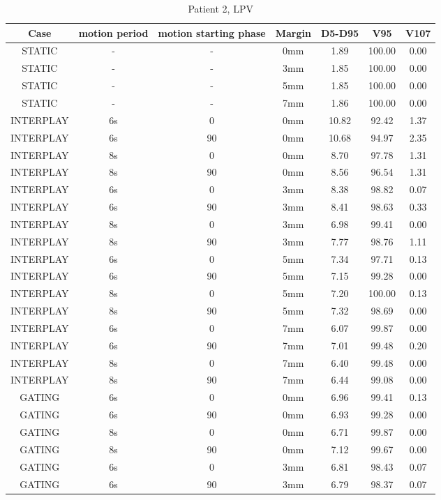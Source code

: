 \begin{table}[H]
  \centering
  \caption{Patient 2, LPV}
  \begin{tabular}{|c||c|c|c||c|c|c|}
    \hline\hline
    Case & motion period & motion starting phase & Margin & D5-D95 & V95 & V107\\
    \hline 
STATIC & - & - & 0mm & 1.89 & 100.00 & 0.00 \\
STATIC & - & - & 3mm & 1.85 & 100.00 & 0.00 \\
STATIC & - & - & 5mm & 1.85 & 100.00 & 0.00 \\
STATIC & - & - & 7mm & 1.86 & 100.00 & 0.00 \\
INTERPLAY & 6s & 0 & 0mm & 10.82 & 92.42 & 1.37 \\
INTERPLAY & 6s & 90 & 0mm & 10.68 & 94.97 & 2.35 \\
INTERPLAY & 8s & 0 & 0mm & 8.70 & 97.78 & 1.31 \\
INTERPLAY & 8s & 90 & 0mm & 8.56 & 96.54 & 1.31 \\
INTERPLAY & 6s & 0 & 3mm & 8.38 & 98.82 & 0.07 \\
INTERPLAY & 6s & 90 & 3mm & 8.41 & 98.63 & 0.33 \\
INTERPLAY & 8s & 0 & 3mm & 6.98 & 99.41 & 0.00 \\
INTERPLAY & 8s & 90 & 3mm & 7.77 & 98.76 & 1.11 \\
INTERPLAY & 6s & 0 & 5mm & 7.34 & 97.71 & 0.13 \\
INTERPLAY & 6s & 90 & 5mm & 7.15 & 99.28 & 0.00 \\
INTERPLAY & 8s & 0 & 5mm & 7.20 & 100.00 & 0.13 \\
INTERPLAY & 8s & 90 & 5mm & 7.32 & 98.69 & 0.00 \\
INTERPLAY & 6s & 0 & 7mm & 6.07 & 99.87 & 0.00 \\
INTERPLAY & 6s & 90 & 7mm & 7.01 & 99.48 & 0.20 \\
INTERPLAY & 8s & 0 & 7mm & 6.40 & 99.48 & 0.00 \\
INTERPLAY & 8s & 90 & 7mm & 6.44 & 99.08 & 0.00 \\
GATING & 6s & 0 & 0mm & 6.96 & 99.41 & 0.13 \\
GATING & 6s & 90 & 0mm & 6.93 & 99.28 & 0.00 \\
GATING & 8s & 0 & 0mm & 6.71 & 99.87 & 0.00 \\
GATING & 8s & 90 & 0mm & 7.12 & 99.67 & 0.00 \\
GATING & 6s & 0 & 3mm & 6.81 & 98.43 & 0.07 \\
GATING & 6s & 90 & 3mm & 6.79 & 98.37 & 0.07 \\

\end{tabular}
\end{table}
